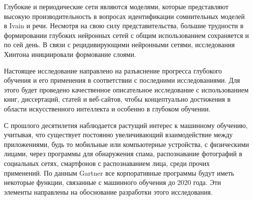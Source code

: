 Глубокие и периодические сети являются моделями,
которые представляют высокую производительность в вопросах идентификации сомнительных моделей
в Ivain и речи. Несмотря на свою силу представительства,
большие трудности в формировании глубоких нейронных сетей с общим использованием сохраняется и по сей день.
В связи с рецидивирующими нейронными сетями, исследования Хинтона инициировали формование слоями.

Настоящее исследование направлено на разъяснение прогресса глубокого обучения и его применения в соответствии с последними исследованиями.
Для этого будет проведено качественное описательное исследование с использованием книг, диссертаций, статей и веб-сайтов,
чтобы концептуально достижения в области искусственного интеллекта и особенно в глубоком обучении.

С прошлого десятилетия наблюдается растущий интерес к машинному обучению, учитывая,
что существует постоянно увеличивающий взаимодействие между приложениями,
будь то мобильные или компьютерные устройства, с физическими лицами, через программы для обнаружения спама,
распознавание фотографий в социальных сетях, смартфонов с распознаванием лица, среди прочих применений.
По данным Gartner все корпоративные программы будут иметь некоторые функции,
связанные с машинного обучения до 2020 года.
Эти элементы направлены на обоснование разработки этого исследования.